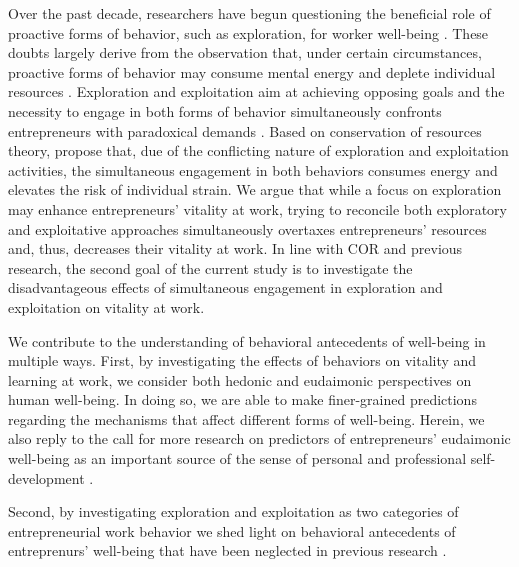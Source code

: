 \documentclass[man, 12pt, a4paper, noextraspace]{apa6}
\begin{document}
Over the past decade, researchers have begun questioning the beneficial role of proactive forms of behavior, such as exploration, for worker well-being \parencite[see][]{Bolino.2010, Strauss2017, Parker2019}. 
These doubts largely derive from the observation that, under certain circumstances, proactive forms of behavior may consume mental energy \parencite{Bolino.2010} and deplete individual resources \parencite{Grant.2011}. 
Exploration and exploitation aim at achieving opposing goals and the necessity to engage in both forms of behavior simultaneously confronts entrepreneurs with paradoxical demands \parencite{Andriopoulos2009, Rosing.2017}.
Based on conservation of resources \parencite[COR;][]{Hobfoll.1989} theory, \textcite{Hunter2017} propose that, due of the conflicting nature of exploration and exploitation activities, the simultaneous engagement in both behaviors consumes energy and elevates the risk of individual strain. 
We argue that while a focus on exploration may enhance entrepreneurs' vitality at work, trying to reconcile both exploratory and exploitative approaches simultaneously overtaxes entrepreneurs' resources and, thus, decreases their vitality at work. 
In line with COR and previous research, the second goal of the current study is to investigate the disadvantageous effects of simultaneous engagement in exploration and exploitation on vitality at work. \par  



We contribute to the understanding of behavioral antecedents of well-being in multiple ways. 
First, by investigating the effects of behaviors on vitality and learning at work, we consider both hedonic and eudaimonic perspectives on human well-being.
In doing so, we are able to make finer-grained predictions regarding the mechanisms that affect different forms of well-being.
Herein, we also reply to the call for more research on predictors of entrepreneurs' eudaimonic well-being as an important source of the sense of personal and professional self-development \parencite{Stephan2018, Ryff2019}. \par 

Second, by investigating exploration and exploitation as two categories of entrepreneurial work behavior we shed light on behavioral antecedents of entreprenurs' well-being that have been neglected in previous research \parencite[see][]{Stephan2018}. \par 
\end{document}

